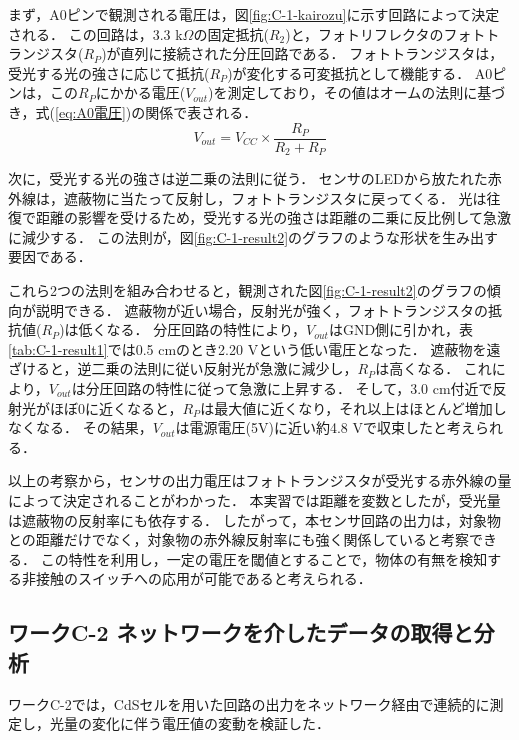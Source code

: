 まず，A0ピンで観測される電圧は，図\ref{fig:C-1-kairozu}に示す回路によって決定される．
この回路は，3.3 k$\Omega$の固定抵抗($R_2$)と，フォトリフレクタのフォトトランジスタ($R_P$)が直列に接続された分圧回路である\cite{workC_分圧回路}．
フォトトランジスタは，受光する光の強さに応じて抵抗($R_P$)が変化する可変抵抗として機能する．
A0ピンは，この$R_P$にかかる電圧($V_{out}$)を測定しており，その値はオームの法則に基づき，式(\ref{eq:A0電圧})の関係で表される．
\begin{equation}
  V_{out} = V_{CC} \times \frac{R_P}{R_2 + R_P} \label{eq:A0電圧}
\end{equation}

次に，受光する光の強さは逆二乗の法則に従う．
センサのLEDから放たれた赤外線は，遮蔽物に当たって反射し，フォトトランジスタに戻ってくる．
光は往復で距離の影響を受けるため，受光する光の強さは距離の二乗に反比例して急激に減少する．
この法則が，図\ref{fig:C-1-result2}のグラフのような形状を生み出す要因である．

これら2つの法則を組み合わせると，観測された図\ref{fig:C-1-result2}のグラフの傾向が説明できる．
遮蔽物が近い場合，反射光が強く，フォトトランジスタの抵抗値($R_P$)は低くなる．
分圧回路の特性により，$V_{out}$はGND側に引かれ，表\ref{tab:C-1-result1}では0.5 cmのとき2.20 Vという低い電圧となった．
遮蔽物を遠ざけると，逆二乗の法則に従い反射光が急激に減少し，$R_P$は高くなる．
これにより，$V_{out}$は分圧回路の特性に従って急激に上昇する．
そして，3.0 cm付近で反射光がほぼ0に近くなると，$R_P$は最大値に近くなり，それ以上はほとんど増加しなくなる．
その結果，$V_{out}$は電源電圧(5V)に近い約4.8 Vで収束したと考えられる．

以上の考察から，センサの出力電圧はフォトトランジスタが受光する赤外線の量によって決定されることがわかった．
本実習では距離を変数としたが，受光量は遮蔽物の反射率にも依存する．
したがって，本センサ回路の出力は，対象物との距離だけでなく，対象物の赤外線反射率にも強く関係していると考察できる．
この特性を利用し，一定の電圧を閾値とすることで，物体の有無を検知する非接触のスイッチへの応用が可能であると考えられる．




\subsection{ワークC-2 ネットワークを介したデータの取得と分析}

ワークC-2では，CdSセルを用いた回路の出力をネットワーク経由で連続的に測定し，光量の変化に伴う電圧値の変動を検証した．

